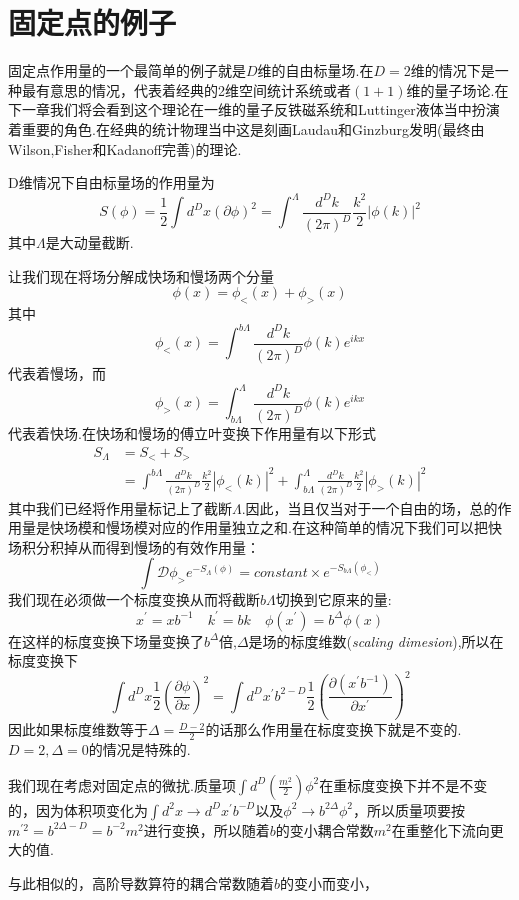 \documentclass{ctexart}
\begin{document}
\section{固定点的例子}
固定点作用量的一个最简单的例子就是$D$维的自由标量场.在$D=2$维的情况下是一种最有意思的情况，代表着经典的2维空间统计系统或者$(1+1)$维的量子场论.在下一章我们将会看到这个理论在一维的量子反铁磁系统和Luttinger液体当中扮演着重要的角色.在经典的统计物理当中这是刻画Laudau和Ginzburg发明(最终由Wilson,Fisher和Kadanoff完善)的理论.\par 
D维情况下自由标量场的作用量为
$$S(\phi)=\frac{1}{2}\int d^D x(\partial\phi)^2=\int^\Lambda\frac{d^D k}{(2\pi)^D}\frac{k^2}{2}|\phi(k)|^2$$
其中$\Lambda$是大动量截断.\par 
让我们现在将场分解成快场和慢场两个分量
$$\phi(x)=\phi_<(x)+\phi_{>}(x)$$
其中
$$\phi_{<}(x)=\int^{b\Lambda}\frac{d^D k}{(2\pi)^D}\phi(k)e^{ikx}$$
代表着慢场，而
$$\phi_{>}(x)=\int_{b\Lambda}^{\Lambda}\frac{d^D k}{(2\pi)^D}\phi(k)e^{ikx}$$
代表着快场.在快场和慢场的傅立叶变换下作用量有以下形式
\begin{align*}
    S_{\Lambda} & =S_{<}+S_{>}\\
    & = \int^{b\Lambda}\frac{d^D k}{(2\pi )^D}\frac{k^2}{2}|\phi_{<}(k)|^2+\int^{\Lambda}_{b\Lambda}\frac{d^D k}{(2\pi)^D}\frac{k^2}{2}|\phi_{>}(k)|^2
\end{align*}
其中我们已经将作用量标记上了截断$\Lambda$.因此，当且仅当对于一个自由的场，总的作用量是快场模和慢场模对应的作用量独立之和.在这种简单的情况下我们可以把快场积分积掉从而得到慢场的有效作用量：
$$\int \mathcal{D}\phi_>e^{-S_{\Lambda
}(\phi)}=constant\times e^{-S_{b\Lambda}(\phi_{<})}$$
我们现在必须做一个标度变换从而将截断$b\Lambda$切换到它原来的量:
$$x^\prime=xb^{-1}\quad k^\prime=bk\quad \phi(x^\prime)=b^\Delta\phi(x)$$
在这样的标度变换下场量变换了$b^\Delta$倍,$\Delta$是场的标度维数(\textit{scaling dimesion}),所以在标度变换下
$$\int d^D x\frac{1}{2}\left(\frac{\partial\phi}{\partial x}\right)^2=\int d^D x^\prime b^{2-D}\frac{1}{2}\left(\frac{\partial(x^\prime b^{-1})}{\partial x^\prime}\right)^2$$
因此如果标度维数等于$\Delta=\frac{D-2}{2}$的话那么作用量在标度变换下就是不变的.$D=2,\Delta=0$的情况是特殊的.\par 
我们现在考虑对固定点的微扰.质量项$\int d^D(\frac{m^2}{2})\phi^2$在重标度变换下并不是不变的，因为体积项变化为$\int d^2 x\rightarrow d^D x^\prime b^{-D}$以及$\phi^2\rightarrow b^{2\Delta}\phi^2$，所以质量项要按$m^{\prime2}=b^{2\Delta-D}=b^{-2}m^2$进行变换，所以随着$b$的变小耦合常数$m^2$在重整化下流向更大的值.\par 
与此相似的，高阶导数算符的耦合常数随着$b$的变小而变小，
\end{document}

